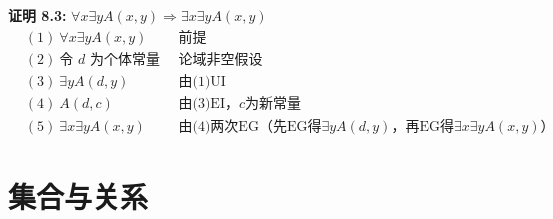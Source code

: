 \documentclass[lang=cn,11pt]{elegantbook}
\begin{document}
\noindent
\textbf{证明 8.3:} $\forall x\exists yA(x,y)\Rightarrow \exists x\exists yA(x,y)$
\vspace{-10pt}
\begin{align*}
&(1)\ \forall x\exists yA(x,y) && \text{前提} \\
&(2)\ \text{令 $d$ 为个体常量} && \text{论域非空假设} \\
&(3)\ \exists yA(d,y) && \text{由(1)UI} \\
&(4)\ A(d,c) && \text{由(3)EI，$c$为新常量} \\
&(5)\ \exists x\exists yA(x,y) && \text{由(4)两次EG（先EG得$\exists yA(d,y)$，再EG得$\exists x\exists yA(x,y)$）}
\end{align*}


\chapter{集合与关系}
\end{document}
